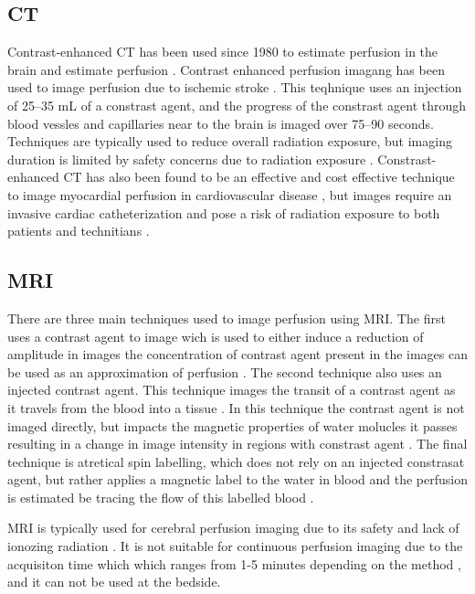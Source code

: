 \subsection{CT}

Contrast-enhanced CT has been used since 1980 to estimate perfusion in the brain 
and estimate perfusion \parencite{axel_cerebral_1980}. Contrast enhanced perfusion imagang 
has been used to image perfusion due to ischemic stroke 
\parencite{miles_colour_1991,koenig_perfusion_1998}.
This teqhnique uses an injection of 25--35 mL 
of a constrast agent, and the progress of the constrast agent through blood vessles 
and capillaries near to the brain is imaged over  75--90 seconds. Techniques are typically used to reduce overall 
radiation exposure, but imaging duration is limited by safety concerns due to radiation exposure
\parencite{konstas_theoretic_2009}.
Constrast-enhanced CT has also been found to be an effective and cost effective 
technique to image myocardial perfusion in cardiovascular disease
\parencite{aljizeeri_ct_2013}, but images require an invasive cardiac catheterization and 
pose a risk of radiation exposure to 
both patients and technitians \parencite{vijayalakshmi_cardiac_2007}.

\subsection{MRI}

There are three main techniques used to image perfusion using 
MRI. The first uses a contrast agent to image wich is used to either induce a reduction of 
amplitude in %
images \parencite{jackson_dynamic_2005} the concentration of 
contrast agent present in the images can be used as an approximation of 
perfusion \parencite{jackson_dynamic_2005}. 
The second technique also uses an injected contrast
agent. This technique images the transit of a contrast agent as it travels 
from the blood into a tissue \parencite{sourbron_classic_2013}. In this technique the contrast
agent is not imaged directly, but impacts the magnetic properties of 
water molucles it passes resulting in a change in image intensity in regions 
with constrast agent \parencite{sourbron_classic_2013}. 
The final technique is atretical spin labelling, which does not rely on 
an injected constrasat agent, but rather applies a  magnetic label to the water 
in blood and the perfusion is estimated be tracing the flow of this labelled 
blood \parencite{koretsky_early_2012}. 

MRI is typically used for cerebral perfusion imaging due to its safety and 
lack of ionozing radiation \parencite{watson_lessons_2015}. It is not suitable for 
continuous perfusion imaging due to the acquisiton time which which 
ranges from 1-5 minutes depending on the method \parencite{essig_perfusion_2013},
and it can not be used at the bedside.

